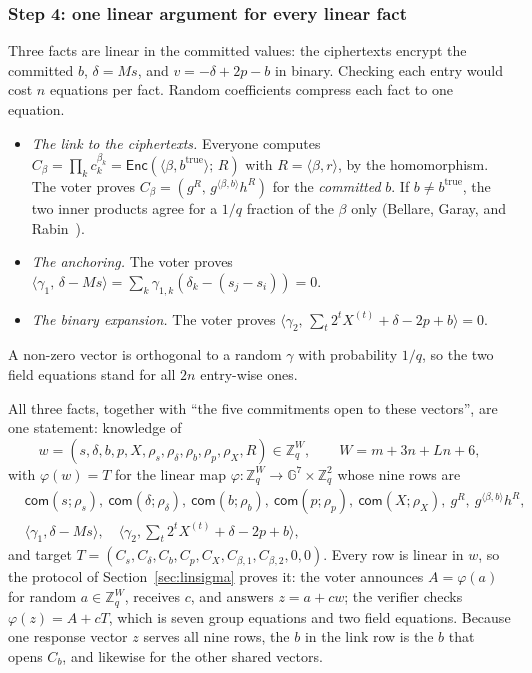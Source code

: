 \documentclass[11pt,a4paper]{article}
\newcommand{\G}{\mathbb{G}}
\newcommand{\Z}{\mathbb{Z}}
\newcommand{\Enc}{\mathsf{Enc}}
\newcommand{\com}{\mathsf{com}}
\theoremstyle{remark}
\begin{document}
\subsubsection*{Step 4: one linear argument for every linear fact}
Three facts are linear in the committed values: the ciphertexts encrypt
the committed $b$, $\delta = Ms$, and $v = -\delta + 2p - b$ in binary.
Checking each entry would cost $n$ equations per fact. Random coefficients
compress each fact to one equation.
\begin{itemize}
  \item \emph{The link to the ciphertexts.} Everyone computes $C_\beta =
  \prod_k c_k^{\beta_k} = \Enc(\langle \beta, b^{\mathrm{true}} \rangle;\,
  R)$ with $R = \langle \beta, r \rangle$, by the homomorphism. The voter
  proves $C_\beta = (g^{R},\, g^{\langle \beta, b \rangle} h^{R})$ for the
  \emph{committed} $b$. If $b \ne b^{\mathrm{true}}$, the two inner
  products agree for a $1/q$ fraction of the $\beta$ only (Bellare, Garay,
  and Rabin~\cite{bgr98}).
  \item \emph{The anchoring.} The voter proves $\langle \gamma_1,\, \delta -
  Ms \rangle = \sum_k \gamma_{1,k} (\delta_k - (s_j - s_i)) = 0$.
  \item \emph{The binary expansion.} The voter proves $\langle \gamma_2,\,
  \sum_t 2^{t} X^{(t)} + \delta - 2p + b \rangle = 0$.
\end{itemize}
A non-zero vector is orthogonal to a random $\gamma$ with probability
$1/q$, so the two field equations stand for all $2n$ entry-wise ones.

All three facts, together with ``the five commitments open to these
vectors'', are one statement: knowledge of
\[
  w = (s, \delta, b, p, X, \rho_s, \rho_\delta, \rho_b, \rho_p, \rho_X, R)
  \in \Z_q^{W}, \qquad W = m + 3n + Ln + 6,
\]
with $\varphi(w) = T$ for the linear map $\varphi : \Z_q^{W} \to \G^{7}
\times \Z_q^{2}$ whose nine rows are
\begin{align*}
  &\com(s; \rho_s),\ \com(\delta; \rho_\delta),\ \com(b; \rho_b),\ \com(p;
  \rho_p),\ \com(X; \rho_X),\ g^{R},\ g^{\langle \beta, b \rangle} h^{R},\\
  &\langle \gamma_1, \delta - Ms \rangle,\quad \textstyle\langle \gamma_2,
  \sum_t 2^{t} X^{(t)} + \delta - 2p + b \rangle,
\end{align*}
and target $T = (C_s, C_\delta, C_b, C_p, C_X, C_{\beta,1}, C_{\beta,2}, 0,
0)$. Every row is linear in $w$, so the protocol of
Section~\ref{sec:linsigma} proves it: the voter announces $A = \varphi(a)$
for random $a \in \Z_q^{W}$, receives $c$, and answers $z = a + c w$; the
verifier checks $\varphi(z) = A + c T$, which is seven group equations and
two field equations. Because one response vector $z$ serves all nine rows,
the $b$ in the link row is the $b$ that opens $C_b$, and likewise for the
other shared vectors.
\end{document}
